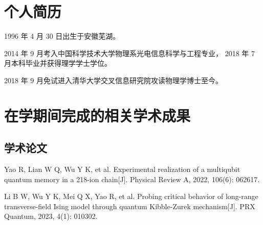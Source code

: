 
\begin{resume}

  \section*{个人简历}

  1996 年 4 月 30 日出生于安徽芜湖。

  2014 年 9 月考入中国科学技术大学物理系光电信息科学与工程专业， 2018 年 7 月本科毕业并获得理学学士学位。

  2018 年 9 月免试进入清华大学交叉信息研究院攻读物理学博士至今。


  \section*{在学期间完成的相关学术成果}

  \subsection*{学术论文}

  \begin{achievements}
    \item Yao R, Lian W Q, Wu Y K, et al. Experimental realization of a multiqubit quantum memory in a 218-ion chain[J]. Physical Review A, 2022, 106(6): 062617.
    \item Li B W, Wu Y K, Mei Q X, Yao R, et al. Probing critical behavior of long-range transverse-field Ising model through quantum Kibble-Zurek mechanism[J]. PRX Quantum, 2023, 4(1): 010302.
  \end{achievements}

\end{resume}
